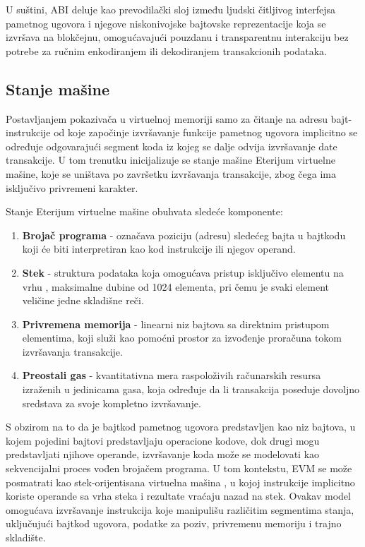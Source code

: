 U suštini, ABI deluje kao prevodilački sloj između ljudski čitljivog interfejsa pametnog ugovora i njegove niskonivojske bajtovske reprezentacije koja se izvršava na blokčejnu, omogućavajući pouzdanu i transparentnu interakciju bez potrebe za ručnim enkodiranjem ili dekodiranjem transakcionih podataka.

\subsection{Stanje mašine}
Postavljanjem pokazivača u virtuelnoj memoriji samo za čitanje na adresu bajt-instrukcije od koje započinje izvršavanje funkcije pametnog ugovora implicitno se određuje odgovarajući segment koda  iz kojeg se dalje odvija izvršavanje date transakcije. U tom trenutku inicijalizuje se stanje mašine Eterijum virtuelne mašine, koje se uništava po završetku izvršavanja transakcije, zbog čega ima isključivo privremeni karakter.

Stanje Eterijum virtuelne mašine obuhvata sledeće komponente:
\begin{enumerate}
\item \textbf{Brojač programa } - označava poziciju (adresu) sledećeg bajta u bajtkodu koji će biti interpretiran kao kod instrukcije ili njegov operand.
\item \textbf{Stek} - struktura podataka koja omogućava pristup isključivo elementu na vrhu , maksimalne dubine od 1024 elementa, pri čemu je svaki element veličine jedne skladišne reči.
\item \textbf{Privremena memorija} - linearni niz bajtova sa direktnim pristupom elementima, koji služi kao pomoćni prostor za izvođenje proračuna tokom izvršavanja transakcije.
\item \textbf{Preostali gas} - kvantitativna mera raspoloživih računarskih resursa izraženih u jedinicama gasa, koja određuje da li transakcija poseduje dovoljno sredstava za svoje kompletno izvršavanje.
\end{enumerate}

S obzirom na to da je bajtkod pametnog ugovora predstavljen kao niz bajtova, u kojem pojedini bajtovi predstavljaju operacione kodove, dok drugi mogu predstavljati njihove operande, izvršavanje koda može se modelovati kao sekvencijalni proces vođen brojačem programa. U tom kontekstu, EVM se može posmatrati kao stek-orijentisana virtuelna mašina  \cite{smith2005virtual}, u kojoj instrukcije implicitno koriste operande sa vrha steka i rezultate vraćaju nazad na stek. Ovakav model omogućava izvršavanje instrukcija koje manipulišu različitim segmentima stanja, uključujući bajtkod ugovora, podatke za poziv, privremenu memoriju i trajno skladište.

